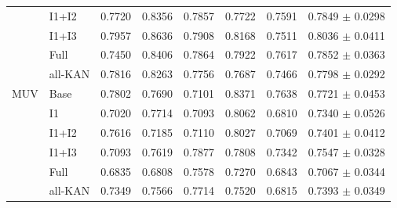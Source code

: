 \documentclass[journal=jcisd8,manuscript=article]{achemso}
\begin{document}
\begin{landscape}
\begin{longtable}{llrrrrrr}
 & I1+I2 & 0.7720 & 0.8356 & 0.7857 & 0.7722 & 0.7591 & 0.7849 $\pm$ 0.0298 \\
 & I1+I3 & 0.7957 & 0.8636 & 0.7908 & 0.8168 & 0.7511 & 0.8036 $\pm$ 0.0411 \\
 & Full & 0.7450 & 0.8406 & 0.7864 & 0.7922 & 0.7617 & 0.7852 $\pm$ 0.0363 \\
 & all-KAN & 0.7816 & 0.8263 & 0.7756 & 0.7687 & 0.7466 & 0.7798 $\pm$ 0.0292 \\
\midrule
MUV & Base & 0.7802 & 0.7690 & 0.7101 & 0.8371 & 0.7638 & 0.7721 $\pm$ 0.0453 \\
 & I1 & 0.7020 & 0.7714 & 0.7093 & 0.8062 & 0.6810 & 0.7340 $\pm$ 0.0526 \\
 & I1+I2 & 0.7616 & 0.7185 & 0.7110 & 0.8027 & 0.7069 & 0.7401 $\pm$ 0.0412 \\
 & I1+I3 & 0.7093 & 0.7619 & 0.7877 & 0.7808 & 0.7342 & 0.7547 $\pm$ 0.0328 \\
 & Full & 0.6835 & 0.6808 & 0.7578 & 0.7270 & 0.6843 & 0.7067 $\pm$ 0.0344 \\
 & all-KAN & 0.7349 & 0.7566 & 0.7714 & 0.7520 & 0.6815 & 0.7393 $\pm$ 0.0349 \\
\bottomrule
\end{longtable}
\end{landscape}
\end{document}
